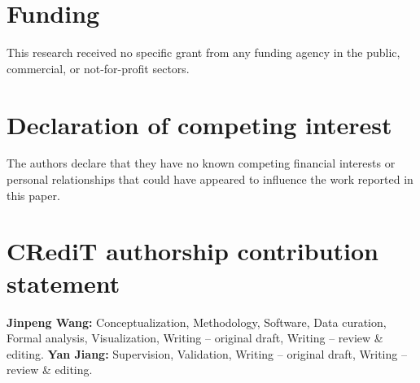 \section*{Funding}
This research received no specific grant from any funding agency in the public, commercial, or not-for-profit sectors.

\section*{Declaration of competing interest}
The authors declare that they have no known competing financial interests or personal relationships that could have appeared to influence the work reported in this paper.

\section*{CRediT authorship contribution statement}
\textbf{Jinpeng Wang:} Conceptualization, Methodology, Software, Data curation, Formal analysis, Visualization, Writing -- original draft, Writing -- review \& editing.
\textbf{Yan Jiang:} Supervision, Validation, Writing -- original draft, Writing -- review \& editing.
